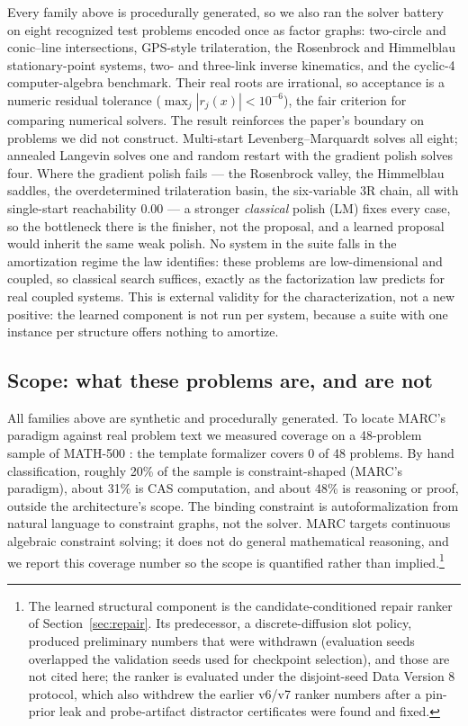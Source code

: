 \documentclass[11pt]{article}
\begin{document}
Every family above is procedurally generated, so we also ran the solver battery on eight
recognized test problems encoded once as factor graphs: two-circle and conic--line
intersections, GPS-style trilateration, the Rosenbrock and Himmelblau stationary-point systems,
two- and three-link inverse kinematics, and the cyclic-4 computer-algebra benchmark. Their real
roots are irrational, so acceptance is a numeric residual tolerance ($\max_j |r_j(x)| < 10^{-6}$),
the fair criterion for comparing numerical solvers.
The result reinforces the paper's boundary on problems we did not construct. Multi-start
Levenberg--Marquardt solves all eight; annealed Langevin solves one and random restart with the
gradient polish solves four. Where the gradient polish fails --- the Rosenbrock valley, the
Himmelblau saddles, the overdetermined trilateration basin, the six-variable 3R chain, all with
single-start reachability $0.00$ --- a stronger \emph{classical} polish (LM) fixes every case,
so the bottleneck there is the finisher, not the proposal, and a learned proposal would inherit
the same weak polish. No system in the suite falls in the amortization regime the law identifies:
these problems are low-dimensional and coupled, so classical search suffices, exactly as the
factorization law predicts for real coupled systems. This is external validity for the
characterization, not a new positive: the learned component is not run per system, because a
suite with one instance per structure offers nothing to amortize.

\subsection{Scope: what these problems are, and are not}
\label{sec:scope}

All families above are synthetic and procedurally generated. To locate MARC's paradigm against
real problem text we measured coverage on a 48-problem sample of MATH-500
\citep{hendrycks2021math}: the template formalizer covers 0 of 48 problems. By hand
classification, roughly 20\% of the sample is constraint-shaped (MARC's paradigm), about 31\%
is CAS computation, and about 48\% is reasoning or proof, outside the architecture's scope.
The binding constraint is autoformalization from natural language to constraint graphs, not
the solver. MARC targets continuous algebraic constraint solving; it does not do general
mathematical reasoning, and we report this coverage number so the scope is quantified rather
than implied.\footnote{The learned structural component is the candidate-conditioned repair
ranker of Section~\ref{sec:repair}. Its predecessor, a discrete-diffusion slot policy, produced
preliminary numbers that were withdrawn (evaluation seeds overlapped the validation seeds used
for checkpoint selection), and those are not cited here; the ranker is evaluated under the
disjoint-seed Data Version 8 protocol, which also withdrew the earlier v6/v7 ranker numbers
after a pin-prior leak and probe-artifact distractor certificates were found and fixed.}
\end{document}
